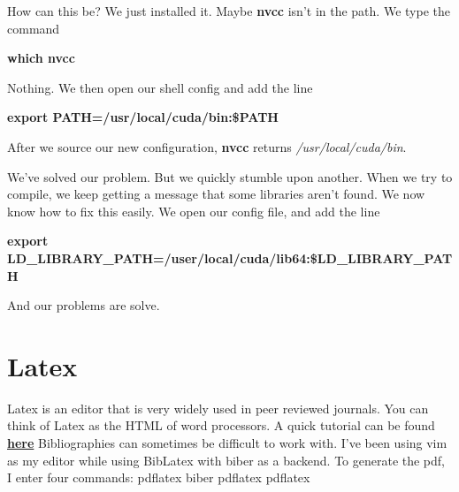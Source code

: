 \documentclass{article}
\begin{document}
\hfill

How can this be?
We just installed it.
Maybe \textbf{nvcc} isn't in the path.
We type the command  \smallskip \\

\centerline{\textbf{which nvcc}} \smallskip

\hfill

Nothing.
We then open our shell config and add the line \smallskip \\

\centerline{\textbf{export PATH=/usr/local/cuda/bin:\$PATH}} \smallskip

\hfill

After we source our new configuration, \textbf{nvcc} returns \textit{/usr/local/cuda/bin}.

\hfill

We've solved our problem.
But we quickly stumble upon another.
When we try to compile, we keep getting a message that some libraries aren't found.
We now know how to fix this easily. We open our config file, and add the line \smallskip \\

\centerline{\textbf{export LD\_LIBRARY\_PATH=/user/local/cuda/lib64:\$LD\_LIBRARY\_PATH}}

\hfill

And our problems are solve.

\section*{Latex}

Latex is an editor that is very widely used in peer reviewed journals.
You can think of Latex as the HTML of word processors.
A quick tutorial can be found \href{http://www.latex-tutorial.com/tutorials/}{\textbf{here}}
Bibliographies can sometimes be difficult to work with.
I've been using vim as my editor while using BibLatex with biber as a backend.
To generate the pdf, I enter four commands:
pdflatex
biber
pdflatex
pdflatex
\end{document}
